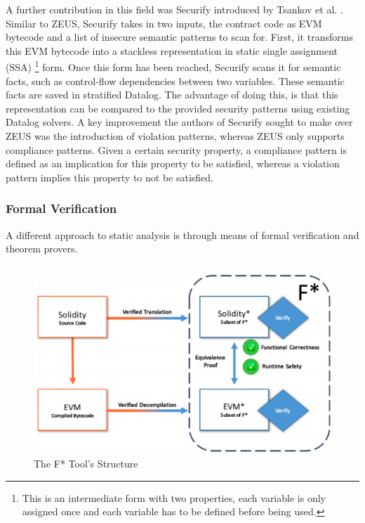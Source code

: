 \documentclass[letterpaper,twocolumn,10pt]{article}
\begin{document}
A further contribution in this field was Securify introduced by Tsankov et al. \cite{tsankov_dan_drachsler-cohen_gervais_bünzli_vechev_2018}.  Similar to ZEUS, Securify takes in two inputs, the contract code as EVM bytecode and a list of insecure semantic patterns to scan for. First, it transforms this EVM bytecode into a stackless representation in static single assignment (SSA) \footnote{This is an intermediate form with two properties, each variable is only assigned once and each variable has to be defined before being used.} form. Once this form has been reached, Securify scans it for semantic facts, such as control-flow dependencies between two variables. These semantic facts are saved in stratified Datalog. The advantage of doing this, is that this representation can be compared to the provided security patterns using existing Datalog solvers. A key improvement the authors of Securify sought to make over ZEUS was the introduction of violation patterns, whereas ZEUS only supports compliance patterns. Given a certain security property, a compliance pattern is defined as an implication for this property to be satisfied, whereas a violation pattern implies this property to not be satisfied.


\subsubsection{Formal Verification}
A different approach to static analysis is through means of formal verification and theorem provers.

\begin{figure}
\begin{center}
\includegraphics[scale=0.2]{Fstar}
\end{center}
\caption{\label{fig:fstar} The F* Tool's Structure\cite{bhargavan_delignat-lavaud_fournet_gollamudi_gonthier_kobeissi_kulatova_rastogi_sibut-pinote_swamy_etal._2016}}
\end{figure}
\end{document}

